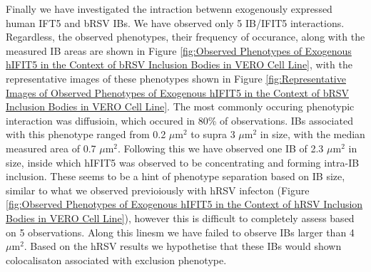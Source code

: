 Finally we have investigated the intraction betwenn exogenously expressed human IFT5 and bRSV IBs. We have observed only 5 IB/IFIT5 interactions. Regardless, the observed phenotypes, their frequency of occurance, along with the measured IB areas are shown in Figure \ref{fig:Observed Phenotypes of Exogenous hIFIT5 in the Context of bRSV Inclusion Bodies in VERO Cell Line}, with the representative images of these phenotypes shown in Figure \ref{fig:Representative Images of Observed Phenotypes of Exogenous hIFIT5 in the Context of bRSV Inclusion Bodies in VERO Cell Line}. The most commonly occuring phenotypic interaction was diffusioin, which occured in 80\% of observations. IBs associated with this phenotype ranged from 0.2 \(\mu \mbox{m}^2\) to supra 3 \(\mu \mbox{m}^2\) in size, with the median measured area of 0.7 \(\mu \mbox{m}^2\). Following this we have observed one IB of 2.3 \(\mu \mbox{m}^2\) in size, inside which hIFIT5 was  observed to be concentrating and forming intra-IB inclusion. These seems to be a hint of phenotype separation based on IB size, similar to what we observed previoiously with hRSV infecton (Figure \ref{fig:Observed Phenotypes of Exogenous hIFIT5 in the Context of hRSV Inclusion Bodies in VERO Cell Line}), however this is difficult to completely assess based on 5 observations. Along this linesm we have failed to observe IBs larger than 4 \(\mu \mbox{m}^2\). Based on the hRSV results we hypothetise that these IBs would shown colocalisaton associated with exclusion phenotype.

